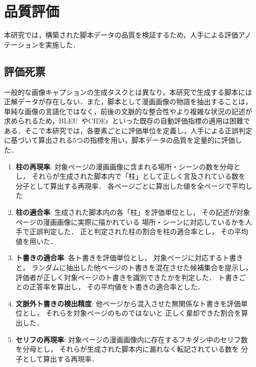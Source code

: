 \documentclass[a4j,12pt]{jsreport}
\begin{document}
\section{品質評価}\label{sec:evaluation_data} 本研究では，構築された脚本データの品質を検証するため，人手による評価アノテーションを実施した．

\subsection{評価死票} 一般的な画像キャプションの生成タスクとは異なり，本研究で生成する脚本には正解データが存在しない．また，脚本として漫画画像の物語を抽出することは，単純な画像の言語化ではなく，前後の文脈的な整合性やより複雑な状況の記述が求められるため，BLEU~\cite{papineni_bleu_2002}やCIDEr~\cite{vedantam2015cider}といった既存の自動評価指標の適用は困難である．そこで本研究では，各要素ごとに評価単位を定義し，人手による正誤判定に基づいて算出される5つの指標を用い，脚本データの品質を定量的に評価した．

\begin{enumerate}

   \item \textbf{柱の再現率}:
         対象ページの漫画画像に含まれる場所・シーンの数を分母とし，
         それらが生成された脚本内で「柱」として正しく言及されている数を
         分子として算出する再現率．
         各ページごとに算出した値を全ページで平均した

   \item \textbf{柱の適合率}:
         生成された脚本内の各「柱」を評価単位とし，
         その記述が対象ページの漫画画像に実際に描かれている
         場所・シーンに対応しているかを人手で正誤判定した．
         正と判定された柱の割合を柱の適合率とし，
         その平均値を用いた．

   \item \textbf{ト書きの適合率}:
         各ト書きを評価単位とし，
         対象ページに対応するト書きと，
         ランダムに抽出した他ページのト書きを混在させた候補集合を提示し，
         評価者が正しく対象ページのト書きを識別できたかを判定した．
         ト書きごとの正答率を算出し，
         その平均値をト書きの適合率とした．

   \item \textbf{文脈外ト書きの検出精度}:
         他ページから混入させた無関係なト書きを評価単位とし，
         それらを対象ページのものではないと
         正しく棄却できた割合を算出した．

   \item \textbf{セリフの再現率}:
         対象ページの漫画画像内に存在するフキダシ中のセリフ数を分母とし，
         それらが生成された脚本内に漏れなく転記されている数を
         分子として算出する再現率．
\end{enumerate}
\end{document}
